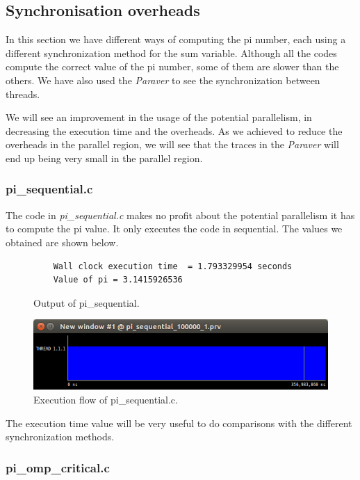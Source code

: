 \documentclass[12pt, a4paper]{article}
\begin{document}
\subsection{Synchronisation overheads}

In this section we have different ways of computing the pi number, each using a different synchronization method for the sum variable. Although all the codes compute the correct value of the pi number, some of them are slower than the others. We have also used the \textit{Paraver} to see the synchronization between threads.

We will see an improvement in the usage of the potential parallelism, in decreasing the execution time and the overheads. As we achieved to reduce the overheads in the parallel region, we will see that the traces in the \textit{Paraver} will end up being very small in the parallel region.

\subsubsection{pi\_sequential.c}

The code in \textit{pi\_sequential.c} makes no profit about the potential parallelism it has to compute the pi value. It only executes the code in sequential. The values we obtained are shown below.

\begin{figure}[H]
	\begin{lstlisting}
	Wall clock execution time  = 1.793329954 seconds
	Value of pi = 3.1415926536		
	\end{lstlisting}
	\caption{Output of pi\_sequential.}
\end{figure}

\begin{figure}[H]
  \centering
  \includegraphics[scale=0.5]{./images/pi_sequential}
  \caption{Execution flow of pi\_sequential.c.}
  \label{pi_sequential}
\end{figure}

The execution time value will be very useful to do comparisons with the different synchronization methods.

\subsubsection{pi\_omp\_critical.c}
\end{document}
